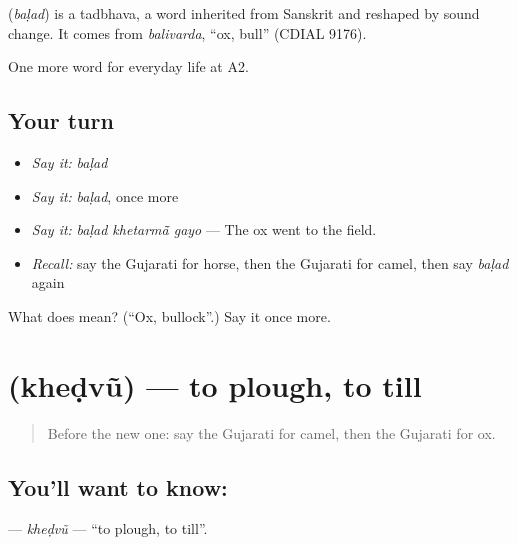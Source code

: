 \begin{cousinweb}
\textbf{} (\emph{baḷad}) is a tadbhava, a word inherited from Sanskrit and reshaped by sound change. It comes from \emph{balivarda}, \textquotedblleft{}ox, bull\textquotedblright{} (CDIAL 9176).
\end{cousinweb}

\begin{grammarlens}[title={What you've built}]
One more word for everyday life at A2.
\end{grammarlens}

\subsection*{Your turn}
\begin{itemize}
\raggedright
  \item \emph{Say it:} \emph{baḷad}
  \item \emph{Say it:} \emph{baḷad}, once more
  \item \emph{Say it:} \emph{baḷad khetarmā̃ gayo} — The ox went to the field.
  \item \emph{Recall:} say the Gujarati for horse, then the Gujarati for camel, then say \emph{baḷad} again
\end{itemize}

\begin{tcolorbox}[breakable,colback=teal!4,colframe=teal!35!black,title={Before you move on}]
What does  mean? (\textquotedblleft{}Ox, bullock\textquotedblright{}.) Say it once more.
\end{tcolorbox}
\section[\texorpdfstring{\gu{ખેડવું} (kheḍvũ)}{ખેડવું (kheḍvũ)}]{ (kheḍvũ) — to plough, to till}

\label{lesson:GU-C233-khedvu}



\begin{quote}
Before the new one: say the Gujarati for camel, then the Gujarati for ox.
\end{quote}

\subsection*{You'll want to know: }
\textbf{} — \emph{kheḍvũ} — \textquotedblleft{}to plough, to till\textquotedblright{}.

